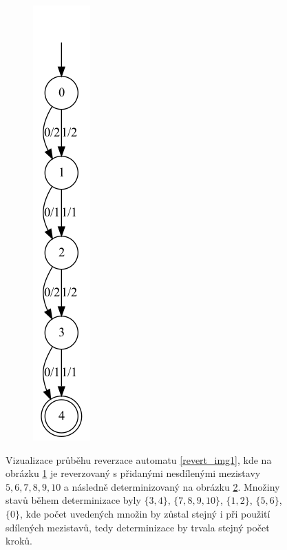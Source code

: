 \begin{figure}[h]
\begin{subfigure}{.4\textwidth}
        \caption{}
        \label{revert_img2}
    \end{subfigure}
    \hfil
    \begin{subfigure}{.3\textwidth}
        \centering
        \includegraphics[scale=0.3]{obrazky-figures/revert_img3.png}
        \caption{}
        \label{revert_img3}
    \end{subfigure}
    \caption{Vizualizace průběhu reverzace automatu \ref{revert_img1}, kde na obrázku \ref{revert_img2} je reverzovaný s přidanými nesdílenými mezistavy $5,6,7,8,9,10$ a následně determinizovaný na obrázku \ref{revert_img3}. Množiny stavů během determinizace byly $\{3,4\}$, $\{7,8,9,10\}$, $\{1,2\}$, $\{5,6\}$, $\{0\}$, kde počet uvedených množin by zůstal stejný i při použití sdílených mezistavů, tedy determinizace by trvala stejný počet kroků.}
    \label{revert_img}
\end{figure}

